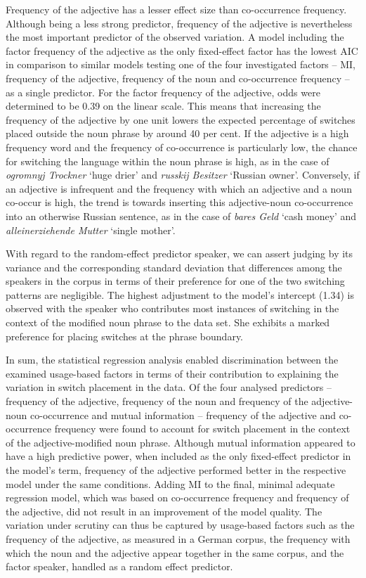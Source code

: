 Frequency of the adjective has a lesser effect size than co-occurrence frequency. Although being a less strong predictor, frequency of the adjective is nevertheless the most important predictor of the observed variation. A model including the factor frequency of the adjective as the only fixed-effect factor has the lowest AIC in comparison to similar models testing one of the four investigated factors -- MI, frequency of the adjective, frequency of the noun and co-occurrence frequency -- as a single predictor. For the factor frequency of the adjective, odds were determined to be 0.39 on the linear scale. This means that increasing the frequency of the adjective by one unit lowers the expected percentage of switches placed outside the noun phrase by around 40 per cent. If the adjective is a high frequency word and the frequency of co-occurrence is particularly low, the chance for switching the language within the noun phrase is high, as in the case of \textit{ogromnyj Trockner} `huge drier' and \textit{russkij Besitzer} `Russian owner'. Conversely, if an adjective is infrequent and the frequency with which an adjective and a noun co-occur is high, the trend is towards inserting this adjective-noun co-occurrence into an otherwise Russian sentence, as in the case of \textit{bares Geld} `cash money' and \textit{alleinerziehende Mutter} `single mother'.

With regard to the random-effect predictor speaker, we can assert judging by its variance and the corresponding standard deviation that differences among the speakers in the corpus in terms of their preference for one of the two switching patterns are negligible. The highest adjustment to the model's intercept (1.34) is observed with the speaker who contributes most instances of switching in the context of the modified noun phrase to the data set. She exhibits a marked preference for placing switches at the phrase boundary.

In sum, the statistical regression analysis enabled discrimination between the examined usage-based factors in terms of their contribution to explaining the variation in switch placement in the data. Of the four analysed predictors -- frequency of the adjective, frequency of the noun and frequency of the adjective-noun co-occurrence and mutual information -- frequency of the adjective and co-occurrence frequency were found to account for switch placement in the context of the adjective-modified noun phrase. Although mutual information appeared to have a high predictive power, when included as the only fixed-effect predictor in the model's term, frequency of the adjective performed better in the respective model under the same conditions. Adding MI to the final, minimal adequate regression model, which was based on co-occurrence frequency and frequency of the adjective, did not result in an improvement of the model quality. The variation under scrutiny can thus be captured by usage-based factors such as the frequency of the adjective, as measured in a German corpus, the frequency with which the noun and the adjective appear together in the same corpus, and the factor speaker, handled as a random effect predictor.

